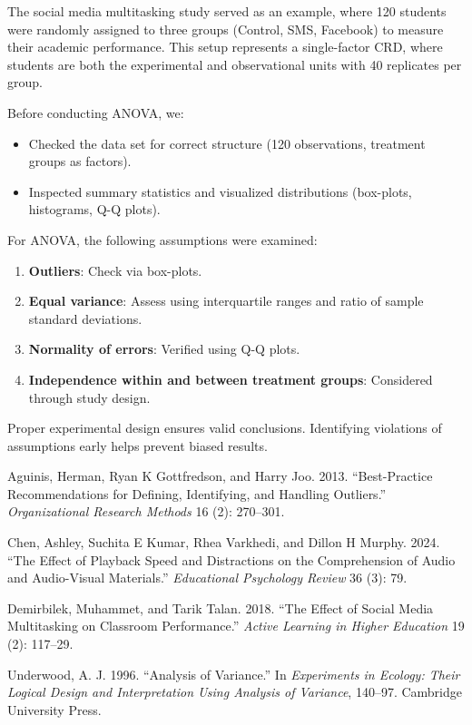 \documentclass[
  letterpaper,
]{book}
\providecommand{\tightlist}{%
  \setlength{\itemsep}{0pt}\setlength{\parskip}{0pt}}\usepackage{longtable,booktabs,array}
\newlength{\cslhangindent}
\newenvironment{CSLReferences}[2] %
 {\begin{list}{}{%
  \setlength{\itemindent}{0pt}
  \setlength{\leftmargin}{0pt}
  \setlength{\parsep}{0pt}
  \ifodd #1
   \setlength{\leftmargin}{\cslhangindent}
   \setlength{\itemindent}{-1\cslhangindent}
  \fi
  \setlength{\itemsep}{#2\baselineskip}}}
 {\end{list}}
\begin{document}
The social media multitasking study served as an example, where 120
students were randomly assigned to three groups (Control, SMS, Facebook)
to measure their academic performance. This setup represents a
single-factor CRD, where students are both the experimental and
observational units with 40 replicates per group.

Before conducting ANOVA, we:

\begin{itemize}
\tightlist
\item
  Checked the data set for correct structure (120 observations,
  treatment groups as factors).
\item
  Inspected summary statistics and visualized distributions (box-plots,
  histograms, Q-Q plots).
\end{itemize}

For ANOVA, the following assumptions were examined:

\begin{enumerate}
\def\labelenumi{\arabic{enumi}.}
\tightlist
\item
  \textbf{Outliers}: Check via box-plots.
\item
  \textbf{Equal variance}: Assess using interquartile ranges and ratio
  of sample standard deviations.
\item
  \textbf{Normality of errors}: Verified using Q-Q plots.
\item
  \textbf{Independence within and between treatment groups}: Considered
  through study design.
\end{enumerate}

Proper experimental design ensures valid conclusions. Identifying
violations of assumptions early helps prevent biased results.

\label{refs}
\begin{CSLReferences}{1}{0}
Aguinis, Herman, Ryan K Gottfredson, and Harry Joo. 2013.
{``Best-Practice Recommendations for Defining, Identifying, and Handling
Outliers.''} \emph{Organizational Research Methods} 16 (2): 270--301.

Chen, Ashley, Suchita E Kumar, Rhea Varkhedi, and Dillon H Murphy. 2024.
{``The Effect of Playback Speed and Distractions on the Comprehension of
Audio and Audio-Visual Materials.''} \emph{Educational Psychology
Review} 36 (3): 79.

Demirbilek, Muhammet, and Tarik Talan. 2018. {``The Effect of Social
Media Multitasking on Classroom Performance.''} \emph{Active Learning in
Higher Education} 19 (2): 117--29.

Underwood, A. J. 1996. {``Analysis of Variance.''} In \emph{Experiments
in Ecology: Their Logical Design and Interpretation Using Analysis of
Variance}, 140--97. Cambridge University Press.

\end{CSLReferences}


\backmatter
\end{document}
